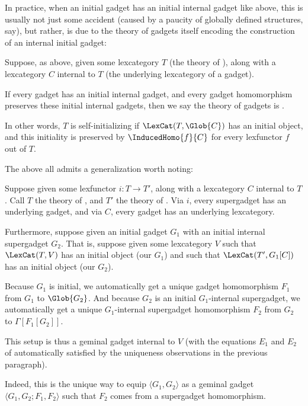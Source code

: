 In practice, when an initial gadget has an initial internal gadget like above, this is usually not just some accident (caused by a paucity of globally defined structures, say), but rather, is due to the theory of gadgets itself encoding the construction of an internal initial gadget:
\begin{definition}
Suppose, as above, given some lexcategory $T$ (the theory of ), along with a lexcategory $C$ internal to $T$ (the underlying lexcategory of a gadget).

If every gadget has an initial internal gadget, and every gadget homomorphism preserves these initial internal gadgets, then we say the theory of gadgets is .

In other words, $T$ is self-initializing if $\LexCat(T, \Glob{C})$ has an initial object, and this initiality is preserved by $\InducedHomo{f}{C}$ for every lexfunctor $f$ out of $T$.
\end{definition}

The above all admits a generalization worth noting:

\begin{construction}\label{SuperInitoGeminalYieldsGeminal}
Suppose given some lexfunctor $i : T \to T'$, along with a lexcategory $C$ internal to $T$. Call $T$ the theory of , and $T'$ the theory of . Via $i$, every supergadget has an underlying gadget, and via $C$, every gadget has an underlying lexcategory.

Furthermore, suppose given an initial gadget $G_1$ with an initial internal supergadget $G_2$. That is, suppose given some lexcategory $V$ such that $\LexCat(T, V)$ has an initial object (our $G_1$) and such that $\LexCat(T', G_1[C])$ has an initial object (our $G_2$).

Because $G_1$ is initial, we automatically get a unique gadget homomorphism $F_1$ from $G_1$ to $\Glob{G_2}$. And because $G_2$ is an initial $G_1$-internal supergadget, we automatically get a unique $G_1$-internal supergadget homomorphism $F_2$ from $G_2$ to $\Gamma[F_1[G_2]]$.

This setup is thus a geminal gadget internal to $V$ (with the equations $E_1$ and $E_2$ of  automatically satisfied by the uniqueness observations in the previous paragraph).

Indeed, this is the unique way to equip $\langle G_1, G_2 \rangle$ as a geminal gadget $\langle G_1, G_2; F_1, F_2 \rangle$ such that $F_2$ comes from a supergadget homomorphism.
\end{construction}

